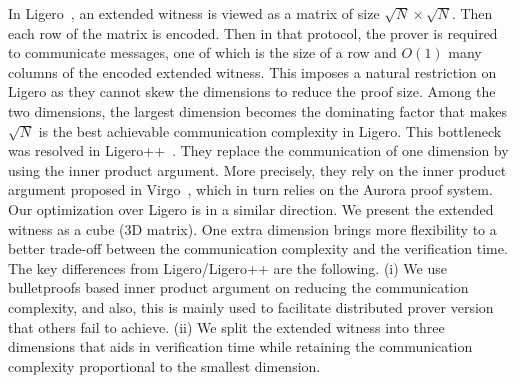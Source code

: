 In Ligero~\cite{ligero}, an extended witness is viewed as a matrix of size $\sqrt{N} \times \sqrt{N}$. Then each row of the matrix is encoded. Then in that protocol, the prover is required to communicate messages, one of which is the size of a row and $O(1)$ many columns of the encoded extended witness. This imposes a natural restriction on Ligero as they cannot skew the dimensions to reduce the proof size. Among the two dimensions, the largest dimension becomes the dominating factor that makes $\sqrt{N}$ is the best achievable communication complexity in Ligero. This bottleneck was resolved in Ligero++~\cite{ligero++}. They replace the communication of one dimension by using the inner product argument. More precisely, they rely on the inner product argument proposed in Virgo~\cite{Virgo}, which in turn relies on the Aurora proof system. Our optimization over Ligero is in a similar direction. We present the extended witness as a cube (3D matrix). One extra dimension brings more flexibility to a better trade-off between the communication complexity and the verification time. The key differences from Ligero/Ligero++ are the following.
(i) We use bulletproofs based inner product argument on reducing the communication complexity, and also, this is mainly used to facilitate distributed prover version that others fail to achieve.
(ii) We split the extended witness into three dimensions that aids in verification time while retaining the communication complexity proportional to the smallest dimension.

